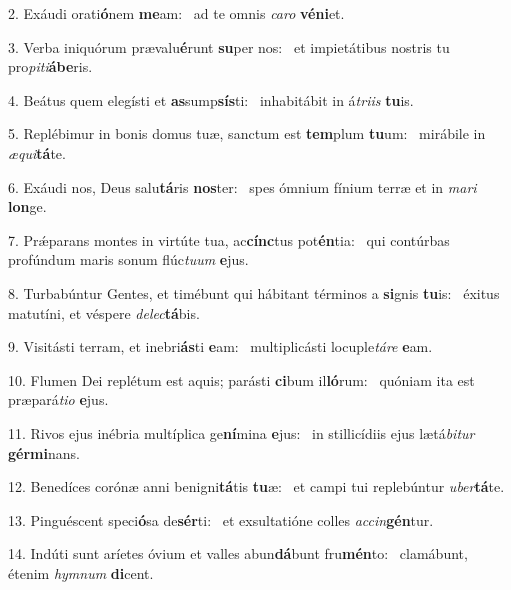 2. Exáudi orati\textbf{ó}nem \textbf{me}am: \ast\  ad te omnis \textit{ca}\textit{ro} \textbf{vé}\textbf{ni}et.\

3. Verba iniquórum prævalu\textbf{é}runt \textbf{su}per nos: \ast\  et impietátibus nostris tu pro\textit{pi}\textit{ti}\textbf{á}\textbf{be}ris.\

4. Beátus quem elegísti et \textbf{as}sump\textbf{sís}ti: \ast\  inhabitábit in á\textit{tri}\textit{is} \textbf{tu}is.\

5. Replébimur in bonis domus tuæ, sanctum est \textbf{tem}plum \textbf{tu}um: \ast\  mirábile in \textit{æ}\textit{qui}\textbf{tá}te.\

6. Exáudi nos, Deus salu\textbf{tá}ris \textbf{nos}ter: \ast\  spes ómnium fínium terræ et in \textit{ma}\textit{ri} \textbf{lon}ge.\

7. Prǽparans montes in virtúte tua, ac\textbf{cínc}tus pot\textbf{én}tia: \ast\  qui contúrbas profúndum maris sonum flúc\textit{tu}\textit{um} \textbf{e}jus.\

8. Turbabúntur Gentes, et timébunt qui hábitant términos a \textbf{si}gnis \textbf{tu}is: \ast\  éxitus matutíni, et véspere \textit{de}\textit{lec}\textbf{tá}bis.\

9. Visitásti terram, et inebri\textbf{ás}ti \textbf{e}am: \ast\  multiplicásti locuple\textit{tá}\textit{re} \textbf{e}am.\

10. Flumen Dei replétum est aquis; parásti \textbf{ci}bum il\textbf{ló}rum: \ast\  quóniam ita est præpará\textit{ti}\textit{o} \textbf{e}jus.\

11. Rivos ejus inébria multíplica ge\textbf{ní}mina \textbf{e}jus: \ast\  in stillicídiis ejus lætá\textit{bi}\textit{tur} \textbf{gér}\textbf{mi}nans.\

12. Benedíces corónæ anni benigni\textbf{tá}tis \textbf{tu}æ: \ast\  et campi tui replebúntur \textit{u}\textit{ber}\textbf{tá}te.\

13. Pinguéscent speci\textbf{ó}sa de\textbf{sér}ti: \ast\  et exsultatióne colles \textit{ac}\textit{cin}\textbf{gén}tur.\

14. Indúti sunt aríetes óvium et valles abun\textbf{dá}bunt fru\textbf{mén}to: \ast\  clamábunt, étenim \textit{hym}\textit{num} \textbf{di}cent.\

